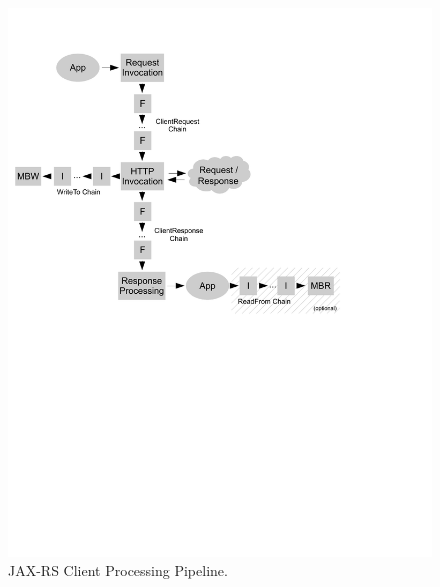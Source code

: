 \begin{figure}[t]
\label{pipeline_client}
\centering
\includegraphics{chapters/pipeline_client.pdf}
\caption{JAX-RS Client Processing Pipeline.}
\end{figure}

